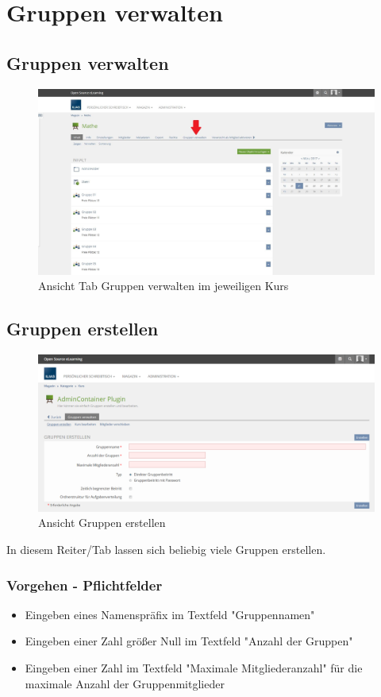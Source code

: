 \chapter{Gruppen verwalten}\label{gruppenVerwalten}
\minitoc
\clearpage


\section{Gruppen verwalten}
\begin{figure}
	\centering
	\includegraphics[width=1\textwidth]{img/gruppenverwalten.jpg}
	\caption{Ansicht Tab Gruppen verwalten im jeweiligen Kurs}
\end{figure}
\clearpage


\section{Gruppen erstellen}
\begin{figure}
	\centering
	\includegraphics[width=1\textwidth]{img/gruppenErstellen.png}
	\caption{Ansicht Gruppen erstellen}
\end{figure}

In diesem Reiter/Tab lassen sich beliebig viele Gruppen erstellen. 
\subsection*{Vorgehen - Pflichtfelder}
\begin{itemize}
	\item Eingeben eines Namenspräfix im Textfeld "Gruppennamen"  
	\item Eingeben einer Zahl größer Null im Textfeld "Anzahl der Gruppen"
	\item Eingeben einer Zahl im Textfeld "Maximale Mitgliederanzahl" für die maximale Anzahl der Gruppenmitglieder 
\end{itemize}

